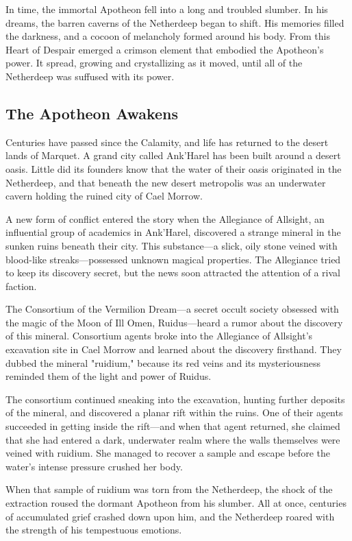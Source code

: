 \documentclass[10pt,a4paper,twoside,fancy,bg=print,twocolumn,openany,nodeprecatedcode]{dndbook}
\begin{document}
In time, the immortal Apotheon fell into a long and troubled slumber. In his dreams, the barren caverns of the Netherdeep began to shift. His memories filled the darkness, and a cocoon of melancholy formed around his body. From this Heart of Despair emerged a crimson element that embodied the Apotheon's power. It spread, growing and crystallizing as it moved, until all of the Netherdeep was suffused with its power.

\subsection{The Apotheon Awakens}
Centuries have passed since the Calamity, and life has returned to the desert lands of Marquet. A grand city called Ank'Harel has been built around a desert oasis. Little did its founders know that the water of their oasis originated in the Netherdeep, and that beneath the new desert metropolis was an underwater cavern holding the ruined city of Cael Morrow.

A new form of conflict entered the story when the Allegiance of Allsight, an influential group of academics in Ank'Harel, discovered a strange mineral in the sunken ruins beneath their city. This substance—a slick, oily stone veined with blood-like streaks—possessed unknown magical properties. The Allegiance tried to keep its discovery secret, but the news soon attracted the attention of a rival faction.

The Consortium of the Vermilion Dream—a secret occult society obsessed with the magic of the Moon of Ill Omen, Ruidus—heard a rumor about the discovery of this mineral. Consortium agents broke into the Allegiance of Allsight's excavation site in Cael Morrow and learned about the discovery firsthand. They dubbed the mineral "ruidium," because its red veins and its mysteriousness reminded them of the light and power of Ruidus.

The consortium continued sneaking into the excavation, hunting further deposits of the mineral, and discovered a planar rift within the ruins. One of their agents succeeded in getting inside the rift—and when that agent returned, she claimed that she had entered a dark, underwater realm where the walls themselves were veined with ruidium. She managed to recover a sample and escape before the water's intense pressure crushed her body.

When that sample of ruidium was torn from the Netherdeep, the shock of the extraction roused the dormant Apotheon from his slumber. All at once, centuries of accumulated grief crashed down upon him, and the Netherdeep roared with the strength of his tempestuous emotions.
\end{document}
